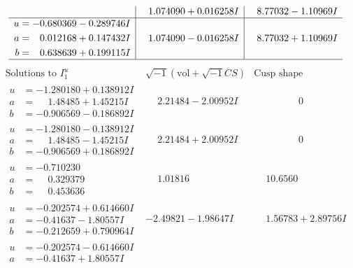 \documentclass[1p]{elsarticle_modified}
\theoremstyle{definition}
\newcommand{\I}{\sqrt{-1}}
\begin{document}
$$\begin{array}{c|c|c}
 & \phantom{-}1.074090 + 0.016258 I & \phantom{-}8.77032 - 1.10969 I \\ \hline\begin{aligned}
u &= -0.680369 - 0.289746 I \\
a &= \phantom{-}0.012168 + 0.147432 I \\
b &= \phantom{-}0.638639 + 0.199115 I\end{aligned}
 & \phantom{-}1.074090 - 0.016258 I & \phantom{-}8.77032 + 1.10969 I\\
 \hline 
 \end{array}$$\newpage$$\begin{array}{c|c|c}  
\text{Solutions to }I^u_{1}& \I (\text{vol} + \sqrt{-1}CS) & \text{Cusp shape}\\
 \hline 
\begin{aligned}
u &= -1.280180 + 0.138912 I \\
a &= \phantom{-}1.48485 + 1.45215 I \\
b &= -0.906569 - 0.186892 I\end{aligned}
 & \phantom{-}2.21484 - 2.00952 I & \phantom{-0.000000 } 0 \\ \hline\begin{aligned}
u &= -1.280180 - 0.138912 I \\
a &= \phantom{-}1.48485 - 1.45215 I \\
b &= -0.906569 + 0.186892 I\end{aligned}
 & \phantom{-}2.21484 + 2.00952 I & \phantom{-0.000000 } 0 \\ \hline\begin{aligned}
u &= -0.710230\phantom{ +0.000000I} \\
a &= \phantom{-}0.329379\phantom{ +0.000000I} \\
b &= \phantom{-}0.453636\phantom{ +0.000000I}\end{aligned}
 & \phantom{-}1.01816\phantom{ +0.000000I} & \phantom{-}10.6560\phantom{ +0.000000I} \\ \hline\begin{aligned}
u &= -0.202574 + 0.614660 I \\
a &= -0.41637 - 1.80557 I \\
b &= -0.212659 + 0.790964 I\end{aligned}
 & -2.49821 - 1.98647 I & \phantom{-}1.56783 + 2.89756 I \\ \hline\begin{aligned}
u &= -0.202574 - 0.614660 I \\
a &= -0.41637 + 1.80557 I \\

\end{aligned}
\end{array}$$
\end{document}
